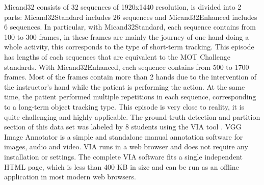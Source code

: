 Micand32 consists of 32 sequences of 1920x1440 resolution, is divided into 2 parts: Micand32Standard includes 26 sequences and Micand32Enhanced includes 6 sequences. In particular, with Micand32Standard, each sequence contains from 100 to 300 frames, in these frames are mainly the journey of one hand doing a whole activity, this corresponds to the type of short-term tracking. This episode has lengths of each sequences that are equivalent to the MOT Challenge standards. With Micand32Enhanced, each sequence contains from 500 to 1700 frames. Most of the frames contain more than 2 hands due to the intervention of the instructor's hand while the patient is performing the action. At the same time, the patient performed multiple repetitions in each sequence, corresponding to a long-term object tracking type. This episode is very close to reality, it is quite challenging and highly applicable. The ground-truth detection and partition section of this data set was labeled by 8 students using the VIA tool \cite{10.1145/3343031.3350535}. VGG Image Annotator is a simple and standalone manual annotation software for images, audio and video. VIA runs in a web browser and does not require any installation or settings. The complete VIA software fits a single independent HTML page, which is less than 400 KB in size and can be run as an offline application in most modern web browsers.
